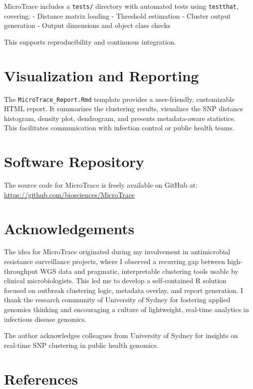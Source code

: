 \documentclass[
]{article}
\begin{document}
MicroTrace includes a \texttt{tests/} directory with automated tests
using \texttt{testthat}, covering: - Distance matrix loading - Threshold
estimation - Cluster output generation - Output dimensions and object
class checks

This supports reproducibility and continuous integration.

\section{Visualization and Reporting}\label{visualization-and-reporting}

The \texttt{MicroTrace\_Report.Rmd} template provides a user-friendly,
customizable HTML report. It summarizes the clustering results,
visualizes the SNP distance histogram, density plot, dendrogram, and
presents metadata-aware statistics. This facilitates communication with
infection control or public health teams.

\section{Software Repository}\label{software-repository}

The source code for MicroTrace is freely available on GitHub at:\\
\url{https://github.com/biosciences/MicroTrace}

\section{Acknowledgements}\label{acknowledgements}

The idea for MicroTrace originated during my involvement in
antimicrobial resistance surveillance projects, where I observed a
recurring gap between high-throughput WGS data and pragmatic,
interpretable clustering tools usable by clinical microbiologists. This
led me to develop a self-contained R solution focused on outbreak
clustering logic, metadata overlay, and report generation. I thank the
research community of University of Sydney for fostering applied
genomics thinking and encouraging a culture of lightweight, real-time
analytics in infectious disease genomics.

The author acknowledges colleagues from University of Sydney for
insights on real-time SNP clustering in public health genomics.

\section*{References}\label{references}
\end{document}
